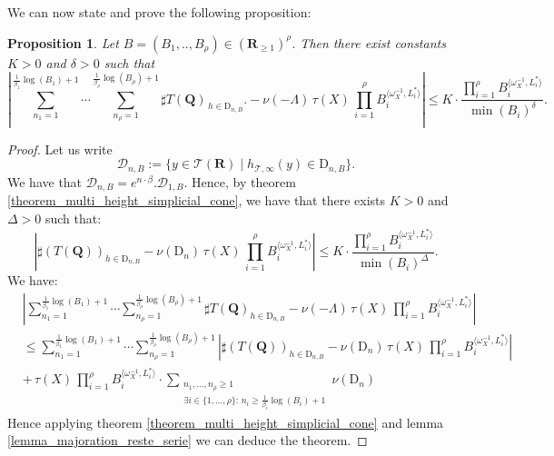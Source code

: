 \documentclass{proc-l}
\newcommand{\R}{\mathbf{R}}
\newcommand{\Q}{\mathbf{Q}}
\newcommand{\stackT}{\mathcal{T}}
\newcommand{\w}{\omega}
\newtheorem{prop}[theorem]{Proposition}
\theoremstyle{definition}
\theoremstyle{remark}
\numberwithin{equation}{section}
\begin{document}
We can now state and prove the following proposition:

\begin{prop}\label{proposition_multi_height_not_bounded_below}
Let $B = (B_1,..,B_{\rho}) \in (\R_{\geqslant 1})^{\rho}$. Then there exist constants $K > 0$ and $\delta > 0$ such that
$$\left|\sum_{n_1 = 1}^{\frac{1}{\beta_1}\log(B_1) + 1}
\cdots
\sum_{n_{\rho} = 1}^{\frac{1}{\beta_{\rho}}\log(B_{\rho}) + 1}
\sharp T(\Q)_{\,h \in \mathrm{D}_{n,B}}. - \nu(-\Lambda) \, \tau(X) \, \prod\limits_{i = 1}^{\rho} B_i^{\langle \w_{X}^{-1},L_i^* \rangle} \right| \leqslant K \cdot \frac{\prod\limits_{i = 1}^{\rho} B_i^{\langle \w_{X}^{-1},L_i^* \rangle}}{\min(B_i)^{\delta}}.$$
\end{prop}

\begin{proof}
Let us write $$\mathcal{D}_{n,B} := \{ y \in \stackT(\R) \mid h_{\stackT,\infty}(y) \in \mathrm{D}_{n,B} \} .$$We have that $\mathcal{D}_{n,B} = e^{n \cdot \beta} . \mathcal{D}_{1,B}$. Hence, by theorem \ref{theorem_multi_height_simplicial_cone}, we have that there exists $K > 0$ and $\Delta > 0$ such that:
$$\left| \sharp ( T(\Q) )_{h \in \mathrm{D}_{n,B}} - \nu(\mathrm{D}_n) \, \tau(X) \, \prod\limits_{i = 1}^{\rho} B_i^{\langle \w_X^{-1},L_i^* \rangle} \right| \leqslant K \cdot \frac{\prod\limits_{i = 1}^{\rho} B_i^{\langle \w_{X}^{-1},L_i^* \rangle}}{\min(B_i)^{\Delta}}.$$
    We have:
    \begin{align*}
        &\left| \sum_{n_1 = 1}^{\frac{1}{\beta_1}\log(B_1) + 1}
\cdots
\sum_{n_{\rho} = 1}^{\frac{1}{\beta_{\rho}}\log(B_{\rho}) + 1} \sharp T(\Q)_{h \in \mathrm{D}_{n,B}} - \nu(-\Lambda) \, \tau(X) \, \prod\limits_{i = 1}^{\rho} B_i^{\langle \w_X^{-1},L_i^* \rangle} \right| \\
        &\leqslant \sum_{n_1 = 1}^{\frac{1}{\beta_1}\log(B_1) + 1}
\cdots
\sum_{n_{\rho} = 1}^{\frac{1}{\beta_{\rho}}\log(B_{\rho}) + 1} \left| \sharp ( T(\Q) )_{h \in \mathrm{D}_{n,B}} - \nu(\mathrm{D}_n) \, \tau(X) \, \prod\limits_{i = 1}^{\rho} B_i^{\langle \w_X^{-1},L_i^* \rangle} \right| \\
        &+ \, \tau(X) \, \prod\limits_{i = 1}^{\rho} B_i^{\langle \w_X^{-1},L_i^* \rangle} \cdot \sum_{\substack{n_1,\dots,n_\rho \ge 1\\ \exists i\in\{1,\dots,\rho\}:\,
n_i \ge \frac{1}{\beta_i}\log(B_i)+1}} \nu(\mathrm{D}_n)
    \end{align*}
    Hence applying theorem \ref{theorem_multi_height_simplicial_cone} and lemma \ref{lemma_majoration_reste_serie} we can deduce the theorem.
\end{proof}
\end{document}

